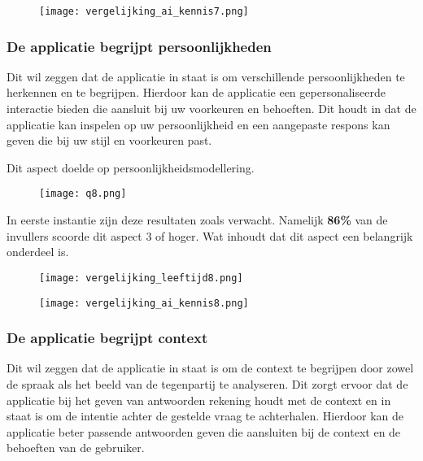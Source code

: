 \begin{figure}[htbp]
    \centering
    \texttt{[image: vergelijking\_ai\_kennis7.png]}
    \label{fig:vergelijking_ai_kennis7}
\end{figure}

\newpage

\subsubsection{De applicatie begrijpt persoonlijkheden}

Dit wil zeggen dat de applicatie in staat is om verschillende persoonlijkheden te herkennen en te begrijpen. Hierdoor kan de applicatie een gepersonaliseerde interactie bieden die aansluit bij uw voorkeuren en behoeften. Dit houdt in dat de applicatie kan inspelen op uw persoonlijkheid en een aangepaste respons kan geven die bij uw stijl en voorkeuren past.

Dit aspect doelde op persoonlijkheidsmodellering.

\begin{figure}[htbp]
    \centering
    \texttt{[image: q8.png]}
    \label{fig:vraag_8_resultaat}
\end{figure}

In eerste instantie zijn deze resultaten zoals verwacht. Namelijk \textbf{86\%} van de invullers scoorde dit aspect 3 of hoger. Wat inhoudt dat dit aspect een belangrijk onderdeel is.

\begin{figure}[htbp]
    \centering
    \texttt{[image: vergelijking\_leeftijd8.png]}
    \label{fig:vergelijking_leeftijd8}
\end{figure}

\begin{figure}[htbp]
    \centering
    \texttt{[image: vergelijking\_ai\_kennis8.png]}
    \label{fig:vergelijking_ai_kennis8}
\end{figure}

\newpage

\subsubsection{De applicatie begrijpt context}

Dit wil zeggen dat de applicatie in staat is om de context te begrijpen door zowel de spraak als het beeld van de tegenpartij te analyseren. Dit zorgt ervoor dat de applicatie bij het geven van antwoorden rekening houdt met de context en in staat is om de intentie achter de gestelde vraag te achterhalen. Hierdoor kan de applicatie beter passende antwoorden geven die aansluiten bij de context en de behoeften van de gebruiker.

